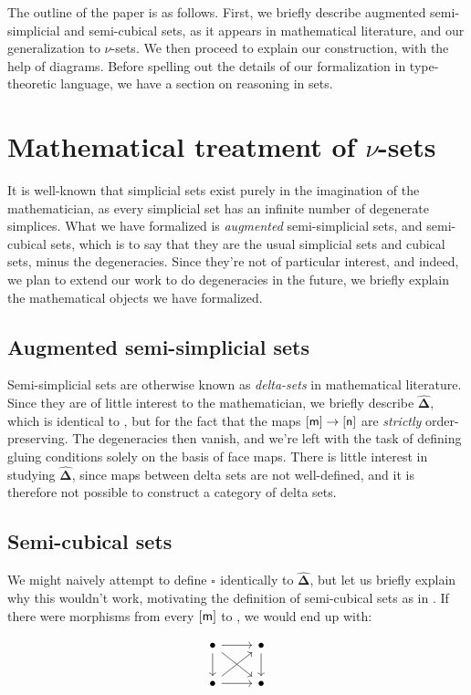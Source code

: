 \documentclass[10pt]{art}
\newcommand{\DeltaHat}{\ensuremath{\hat{\boldsymbol{\Delta}}}}
\newcommand{\Cube}[1]{\ensuremath{\boldsymbol{\square^{#1}}}}
\begin{document}
The outline of the paper is as follows. First, we briefly describe augmented semi-simplicial and semi-cubical sets, as it appears in mathematical literature, and our generalization to $\nu$-sets. We then proceed to explain our construction, with the help of diagrams. Before spelling out the details of our formalization in type-theoretic language, we have a section on reasoning in sets.

\section{Mathematical treatment of \texorpdfstring{$\nu$}{nu}-sets}
It is well-known that simplicial sets exist purely in the imagination of the mathematician, as every simplicial set has an infinite number of degenerate simplices. What we have formalized is \emph{augmented} semi-simplicial sets, and semi-cubical sets, which is to say that they are the usual simplicial sets and cubical sets, minus the degeneracies. Since they're not of particular interest, and indeed, we plan to extend our work to do degeneracies in the future, we briefly explain the mathematical objects we have formalized.

\subsection{Augmented semi-simplicial sets}
Semi-simplicial sets are otherwise known as \emph{delta-sets} in mathematical literature. Since they are of little interest to the mathematician, we briefly describe \DeltaHat, which is identical to \Simplex{}, but for the fact that the maps $\mathsf{[m]} \rightarrow \mathsf{[n]}$ are \emph{strictly} order-preserving. The degeneracies then vanish, and we're left with the task of defining gluing conditions solely on the basis of face maps. There is little interest in studying \DeltaHat, since maps between delta sets are not well-defined, and it is therefore not possible to construct a category of delta sets.

\subsection{Semi-cubical sets}
We might naively attempt to define $\Cube{}$ identically to \DeltaHat, but let us briefly explain why this wouldn't work, motivating the definition of semi-cubical sets as in \cite{Antolini00}. If there were morphisms from every $\mathsf{[m]}$ to , we would end up with:

$$
  \begin{tikzcd}
    \bullet \arrow[r] \arrow[dr] \arrow[d] & \bullet \arrow[d] \\
    \bullet \arrow[r] \arrow[ur] & \bullet
  \end{tikzcd}
$$
\end{document}
